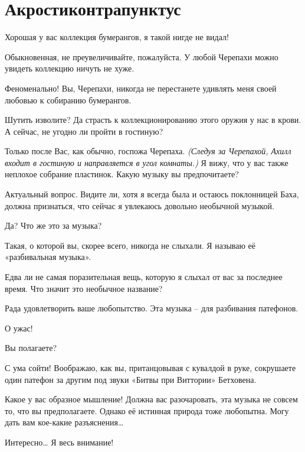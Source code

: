 \documentclass[../main.tex]{subfiles}
\begin{document}
\section{Акростиконтрапунктус}

\begin{Dialogue}

 {\Large Х}орошая у вас коллекция бумерангов, я такой нигде не видал!

 Обыкновенная, не преувеличивайте, пожалуйста. У любой Черепахи можно увидеть коллекцию ничуть не хуже.

 Феноменально! Вы, Черепахи, никогда не перестанете удивлять меня своей любовью к собиранию бумерангов.

 Шутить изволите? Да страсть к коллекционированию этого оружия у нас в крови. А сейчас, не угодно ли пройти в гостиную?

 Только после Вас, как обычно, госпожа Черепаха. \emph{(Следуя за Черепахой, Ахилл входит в гостиную и направляется в угол комнаты.)} Я вижу, что у вас также неплохое собрание пластинок. Какую музыку вы предпочитаете?

 Актуальный вопрос. Видите ли, хотя я всегда была и остаюсь поклонницей Баха, должна признаться, что сейчас я увлекаюсь довольно необычной музыкой.

 Да? Что же это за музыка?

 Такая, о которой вы, скорее всего, никогда не слыхали. Я называю её «разбивальная музыка».

 Едва ли не самая поразительная вещь, которую я слыхал от вас за последнее время. Что значит это необычное название?

 Рада удовлетворить ваше любопытство. Эта музыка \--- для разбивания патефонов.

 О ужас!

 Вы полагаете?

 С ума сойти! Воображаю, как вы, пританцовывая с кувалдой в руке, сокрушаете один патефон за другим под звуки «Битвы при Виттории» Бетховена.

 Какое у вас образное мышление! Должна вас разочаровать, эта музыка не совсем то, что вы предполагаете. Однако её истинная природа тоже любопытна. Могу дать вам кое-какие разъяснения\ldots{}

 Интересно\ldots{} Я весь внимание!


\end{Dialogue}
\end{document}
